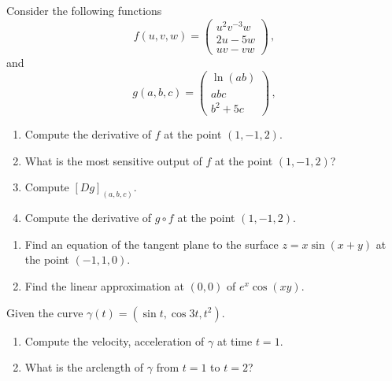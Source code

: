 \documentclass[12pt]{amsart}
\begin{document}
\begin{problem}
    Consider the following functions
    \begin{equation*}
        f(u,v,w) = \begin{pmatrix}
            u^2 v^{-3} w \\ 2u - 5w \\ uv - vw
        \end{pmatrix} \,,
    \end{equation*}
    and
    \begin{equation*}
        g(a,b,c) = 
        \begin{pmatrix}
            \ln (ab) \\
            abc \\
            b^2 + 5c
        \end{pmatrix} \,,
    \end{equation*}
    \begin{enumerate}
        \item Compute the derivative of $f$ at the point $(1, -1, 2)$.
        \item What is the most sensitive output of $f$ at the point $(1, -1, 2)$?
        \item Compute $[Dg]_{(a,b,c)}$.
        \item Compute the derivative of $g\circ f$ at the point $(1, -1, 2)$.
    \end{enumerate}
\end{problem}

\newpage

\begin{problem}[20 points]
    \begin{enumerate}
        \item Find an equation of the tangent plane to the surface $z= x \sin(x+y)$ at the point $(-1,1,0)$.
            \vspace{8cm}
        \item Find the linear approximation at $(0,0)$ of
            $e^x \cos(xy)$.
    \end{enumerate}
\end{problem}
 \newpage


\begin{problem}[20 points]
    Given the curve  $\gamma(t) = (\sin t, \cos 3t, t^2)$.
    \begin{enumerate}
        \item Compute the velocity, acceleration of $\gamma$ at time $t=1$.
        \item What is the arclength of $\gamma$ from $t=1$ to $t=2$?
    \end{enumerate}
\end{problem}
\end{document}
